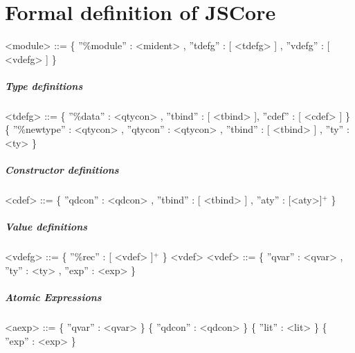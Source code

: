 
\chapter{Formal definition of JSCore}
\label{jscoregrammar}


\begin{grammar}
<module> 	::= \{ ''\%module'' : <mident> , ''tdefg'' : [ <tdefg> ] , ''vdefg'' : [ <vdefg> ] \}
\end{grammar}

\paragraph{Type definitions}

\begin{grammar}
<tdefg> 	  ::= 	 \{ ''\%data'' : <qtycon> , ''tbind'' : [ <tbind> ], ''cdef'' : [ <cdef> ] \}						
		  \alt 	 \{ ''\%newtype'' : <qtycon> , ''qtycon'' : <qtycon> , ''tbind'' : [ <tbind> ] , ''ty'' : <ty> \} 	

\end{grammar}

\paragraph{Constructor definitions}

\begin{grammar}


<cdef>		  ::= 	 \{ ''qdcon'' : <qdcon> , ''tbind'' : [ <tbind>  ] , ''aty'' : [<aty>]$^{+}$ \} 				 			

\end{grammar}

\paragraph{Value definitions}

\begin{grammar}

<vdefg>		  ::= 	\{ ''\%rec'' : [ <vdef> ]$^{+}$ \}    							
<vdef> 		  ::= 	\{ ''qvar'' : <qvar> , ''ty'' : <ty> , ''exp'' : <exp> \}

\end{grammar}

\paragraph{Atomic Expressions}
\begin{grammar}


<aexp>		  ::= 	 \{ ''qvar'' : <qvar> \}
		  \alt 	 \{ ''qdcon'' : <qdcon> \}
		  \alt 	 \{ ''lit'' : <lit> \}
		  \alt 	 \{ ''exp'' : <exp> \} 


\end{grammar}

